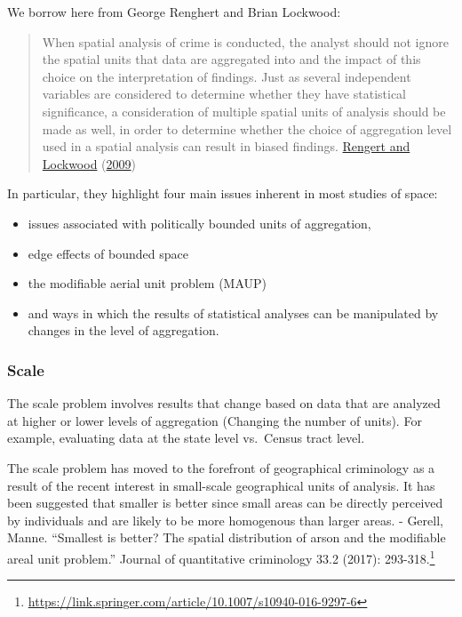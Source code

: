 \documentclass[
]{book}
\providecommand{\tightlist}{%
  \setlength{\itemsep}{0pt}\setlength{\parskip}{0pt}}
\renewcommand{\href}[2]{#2\footnote{\url{#1}}}
\begin{document}
We borrow here from George Renghert and Brian Lockwood:

\begin{quote}
When spatial analysis of crime is conducted, the analyst should not ignore the spatial units that data are aggregated into and the impact of this choice on the interpretation of findings. Just as several independent variables are considered to determine whether they have statistical significance, a consideration of multiple spatial units of analysis should be made as well, in order to determine whether the choice of aggregation level used in a spatial analysis can result in biased findings. \protect\hyperlink{ref-Rengert_2009}{Rengert and Lockwood} (\protect\hyperlink{ref-Rengert_2009}{2009})
\end{quote}

In particular, they highlight four main issues inherent in most studies of space:

\begin{itemize}
\tightlist
\item
  issues associated with politically bounded units of aggregation,
\item
  edge effects of bounded space
\item
  the modifiable aerial unit problem (MAUP)
\item
  and ways in which the results of statistical analyses can be manipulated by changes in the level of
  aggregation.
\end{itemize}

\hypertarget{scale}{%
\subsubsection{Scale}\label{scale}}

The scale problem involves results that change based on data that are analyzed at higher or lower levels of aggregation (Changing the number of units). For example, evaluating data at the state level vs.~Census tract level.

The scale problem has moved to the forefront of geographical criminology as a result of the recent interest in small-scale geographical units of analysis. It has been suggested that smaller is better since small areas can be directly perceived by individuals and are likely to be more homogenous than larger areas.
- \href{https://link.springer.com/article/10.1007/s10940-016-9297-6}{Gerell, Manne. ``Smallest is better? The spatial distribution of arson and the modifiable areal unit problem.'' Journal of quantitative criminology 33.2 (2017): 293-318.}
\end{document}
